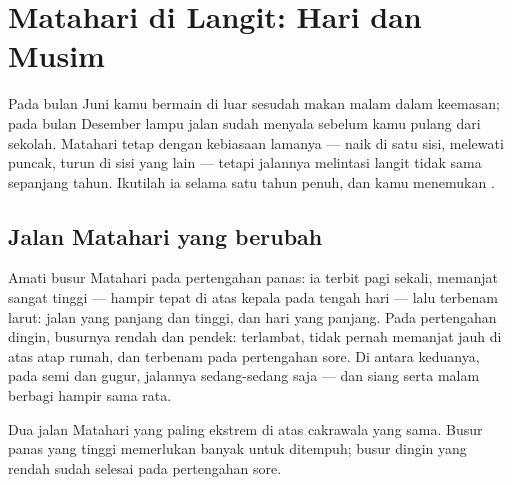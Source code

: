 \chapter{Matahari di Langit: Hari dan Musim}\label{ch:g3:sun-days-seasons}

Pada bulan Juni kamu bermain di luar sesudah makan malam dalam 
keemasan; pada bulan Desember lampu jalan sudah menyala sebelum kamu
pulang dari sekolah. Matahari tetap dengan kebiasaan lamanya --- naik
di satu sisi, melewati puncak, turun di sisi yang lain --- tetapi
jalannya melintasi langit tidak sama sepanjang tahun. Ikutilah ia
selama satu tahun penuh, dan kamu menemukan .

\section{Jalan Matahari yang berubah}

\begin{example}\label{ex:g3:sun-days-seasons:roads}
Amati busur Matahari pada pertengahan  panas: ia terbit pagi
sekali, memanjat sangat tinggi --- hampir tepat di atas kepala pada
tengah hari --- lalu terbenam larut: jalan yang panjang dan tinggi,
dan hari yang panjang. Pada pertengahan  dingin, busurnya rendah
dan pendek:  terlambat, tidak pernah memanjat jauh di
atas atap rumah, dan terbenam pada pertengahan sore. Di antara
keduanya, pada  semi dan  gugur, jalannya sedang-sedang saja
--- dan siang serta malam berbagi  hampir sama rata.
\end{example}

\begin{omfigure}

{\small Dua jalan Matahari yang paling ekstrem di atas cakrawala yang
sama. Busur  panas yang tinggi memerlukan banyak  untuk
ditempuh; busur  dingin yang rendah sudah selesai pada
pertengahan sore.}
\end{omfigure}

